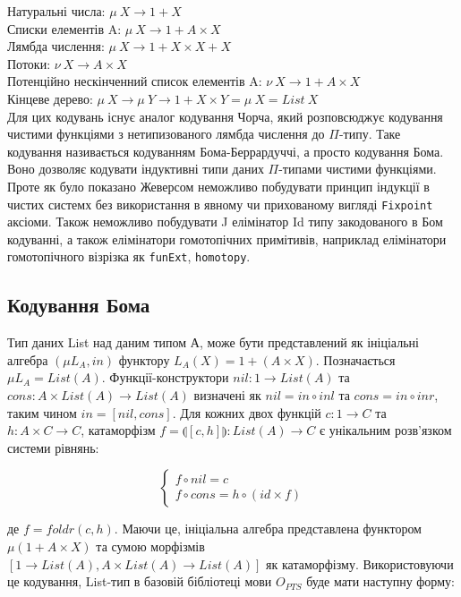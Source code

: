 \noindent Натуральні числа: $\mu\ X \rightarrow 1 + X$\\
Списки елементів A: $\mu\ X \rightarrow 1 + A \times X$\\
Лямбда числення: $\mu\ X \rightarrow 1 + X \times X + X$\\
Потоки: $\nu\ X \rightarrow A \times X$\\
Потенційно нескінченний список елементів A: $\nu\ X \rightarrow 1 + A \times X$\\
Кінцеве дерево: $\mu\ X \rightarrow \mu\ Y \rightarrow 1 + X \times Y = \mu\ X = List\ X$\\

Для цих кодувань існує аналог кодування Чорча, який розповсюджує
кодування чистими функціями з нетипизованого лямбда числення до $\Pi$-типу.
Таке кодування називається кодуванням Бома-Беррардуччі, а просто кодування Бома.
Воно дозволяє кодувати індуктивні типи даних $\Pi$-типами чистими функціями.
Проте як було показано Жеверсом\cite{Geuvers01} неможливо побудувати принцип
індукції в чистих системх без використання в явному чи прихованому
вигляді \lstinline{Fixpoint} аксіоми. Також неможливо побудувати
J елімінатор Id типу закодованого в Бом кодуванні, а також
елімінатори гомотопічних примітивів, наприклад елімінатори гомотопічного
візрізка як \lstinline{funExt}, \lstinline{homotopy}.

\subsection{Кодування Бома}
Тип даних List над даним типом А, може бути представлений як ініціальні алгебра
$(\mu L_A, in)$ функтору $L_A(X) = 1 + (A \times X)$. Позначається $\mu L_A = List(A)$.
Функції-конструктори $nil: 1 \rightarrow List(A)$ та
$cons: A \times List(A) \rightarrow List(A)$ визначені як
$nil = in \circ inl$ та $cons = in \circ inr$, таким чином $in = [nil,cons]$.
Для кожних двох функцій $c: 1 \rightarrow C$ та $h: A \times C \rightarrow C$,
катаморфізм $f = \llparenthesis [c,h] \rrparenthesis : List(A) \rightarrow C$
є унікальним розв'язком системи рівнянь:

$$
\begin{cases}
  f \circ nil  = c \\
  f \circ cons = h \circ (id \times f)
\end{cases}
$$

де $f = foldr(c,h)$. Маючи це, ініціальна алгебра представлена функтором
$\mu (1 + A \times X)$ та сумою морфізмів
$[1 \rightarrow List(A), A \times List(A) \rightarrow List(A)]$
як катаморфізму. Використовуючи це кодування, List-тип в базовій бібліотеці мови $O_{PTS}$
буде мати наступну форму:

